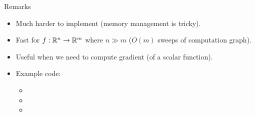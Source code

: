 \begin{frame}{Remarks}
\begin{itemize}
    \item Much harder to implement (memory management is tricky).
    \item Fast for $f:\mathbb{R}^n \to \mathbb{R}^m$ where $n \gg m$ ($O(m)$ sweeps of computation graph).
    \item Useful when we need to compute gradient (of a scalar function).
    \item Example code:
    \begin{itemize}
        \item {}
        \item {}
        \item {}
    \end{itemize}
\end{itemize} 
\end{frame}